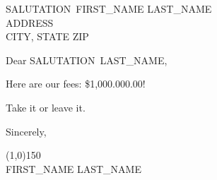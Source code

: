 \documentclass[12pt]{letter}
\begin{document}
	\begin{letter}{SALUTATION\ FIRST_NAME LAST_NAME\\ ADDRESS \\ CITY, STATE  ZIP}
    	\opening{Dear SALUTATION\ LAST_NAME,}
	\thispagestyle{fancy}
	Here are our fees: \$1,000.000.00!
	
	Take it or leave it.
	
	\closing{Sincerely,}
	
	\line(1,0){150}\\
	FIRST_NAME LAST_NAME\\

	\end{letter}
	
\end{document}
